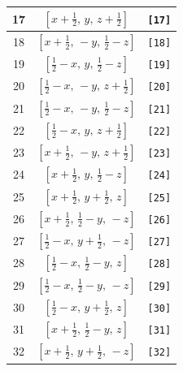 \documentclass[fleqn,8pt]{jsarticle}
\begin{document}
\begin{longtable}{ccc}
17 & $\left[ x + \frac{1}{2},\, y,\, z + \frac{1}{2} \right]$ & {\tt [17]} \\ \hline
18 & $\left[ x + \frac{1}{2},\, - y,\, \frac{1}{2} - z \right]$ & {\tt [18]} \\ \hline
19 & $\left[ \frac{1}{2} - x,\, y,\, \frac{1}{2} - z \right]$ & {\tt [19]} \\ \hline
20 & $\left[ \frac{1}{2} - x,\, - y,\, z + \frac{1}{2} \right]$ & {\tt [20]} \\ \hline
21 & $\left[ \frac{1}{2} - x,\, - y,\, \frac{1}{2} - z \right]$ & {\tt [21]} \\ \hline
22 & $\left[ \frac{1}{2} - x,\, y,\, z + \frac{1}{2} \right]$ & {\tt [22]} \\ \hline
23 & $\left[ x + \frac{1}{2},\, - y,\, z + \frac{1}{2} \right]$ & {\tt [23]} \\ \hline
24 & $\left[ x + \frac{1}{2},\, y,\, \frac{1}{2} - z \right]$ & {\tt [24]} \\ \hline
25 & $\left[ x + \frac{1}{2},\, y + \frac{1}{2},\, z \right]$ & {\tt [25]} \\ \hline
26 & $\left[ x + \frac{1}{2},\, \frac{1}{2} - y,\, - z \right]$ & {\tt [26]} \\ \hline
27 & $\left[ \frac{1}{2} - x,\, y + \frac{1}{2},\, - z \right]$ & {\tt [27]} \\ \hline
28 & $\left[ \frac{1}{2} - x,\, \frac{1}{2} - y,\, z \right]$ & {\tt [28]} \\ \hline
29 & $\left[ \frac{1}{2} - x,\, \frac{1}{2} - y,\, - z \right]$ & {\tt [29]} \\ \hline
30 & $\left[ \frac{1}{2} - x,\, y + \frac{1}{2},\, z \right]$ & {\tt [30]} \\ \hline
31 & $\left[ x + \frac{1}{2},\, \frac{1}{2} - y,\, z \right]$ & {\tt [31]} \\ \hline
32 & $\left[ x + \frac{1}{2},\, y + \frac{1}{2},\, - z \right]$ & {\tt [32]} \\
\end{longtable}
\end{document}
